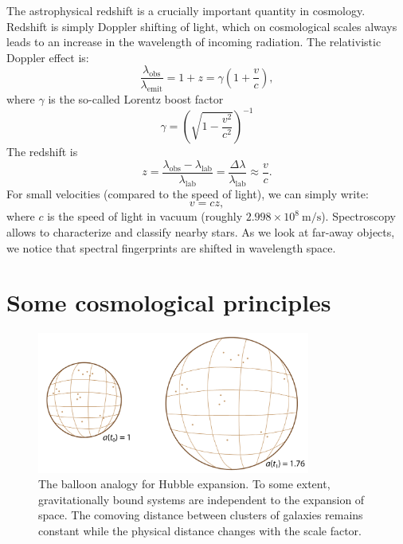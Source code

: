 \documentclass[a4paper,12pt]{article}
\theoremstyle{remark}
\newcommand{\mrm}[1]{\mathrm{#1}}
\renewcommand{\=}[1]{\stackrel{#1}{=}} %
\theoremstyle{plain}
\theoremstyle{definition}
\begin{document}
The astrophysical redshift is a crucially important quantity in cosmology. Redshift is simply Doppler shifting of light, which on cosmological scales always leads to an increase in the wavelength of incoming radiation. The relativistic Doppler effect is:
\begin{equation}
\frac{\lambda _\mrm{obs}}{\lambda _\mrm{emit}} = 1 + z = \gamma \left(1 + \frac{v}{c} \right),
\end{equation}
where $\gamma$ is the so-called Lorentz boost factor
\begin{equation}
\gamma = \left( \sqrt{1 - \frac{v^2}{c^2}} \right)^{-1}
\end{equation}
The redshift is
\begin{equation}
z = \frac{\lambda _\mrm{obs} - \lambda _\mrm{lab}}{\lambda _\mrm{lab}} = \frac{\Delta \lambda}{\lambda _\mrm{lab}} \approx \frac{v}{c}.
\end{equation} 
For small velocities (compared to the speed of light), we can simply write:
\begin{equation}
v = c z,
\end{equation}
where $c$ is the speed of light in vacuum (roughly $2.998 \times 10^{8} \:\mrm{m/s}$). Spectroscopy allows to characterize and classify nearby stars. As we look at far-away objects, we notice that spectral fingerprints are shifted in wavelength space. 


\section{Some cosmological principles} 
\begin{figure}[t]
\begin{center}
    \includegraphics*[angle=0,width=0.8\textwidth]{img/hubble.png}
    \caption[Insert text]{The balloon analogy for Hubble expansion. To some extent, gravitationally bound systems are independent to the expansion of space. The comoving distance between clusters of galaxies remains constant while the physical distance changes with the scale factor.}
\label{fig:hubble_expansion}
\end{center}
\end{figure}
 
\end{document}
